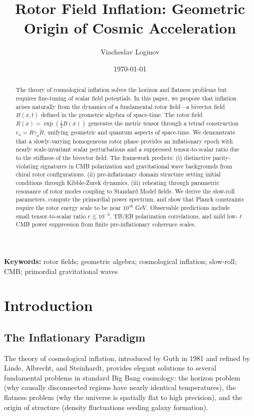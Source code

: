 \documentclass[11pt,a4paper]{article}
\title{Rotor Field Inflation: Geometric Origin of Cosmic Acceleration}
\author[1]{Viacheslav Loginov}
\affil[1]{Kyiv, Ukraine\\ \texttt{barthez.slavik@gmail.com}}
\date{\today} %
\numberwithin{equation}{section}
\theoremstyle{plain}
\theoremstyle{definition}
\theoremstyle{remark}
\newcommand{\keywords}{\textbf{Keywords:} rotor fields; geometric algebra; cosmological inflation; slow-roll; CMB; primordial gravitational waves}
\begin{document}
\maketitle

\begin{abstract}
The theory of cosmological inflation solves the horizon and flatness problems but requires fine-tuning of scalar field potentials. In this paper, we propose that inflation arises naturally from the dynamics of a fundamental rotor field---a bivector field $B(x,t)$ defined in the geometric algebra of space-time. The rotor field $R(x) = \exp(\frac{1}{2}B(x))$ generates the metric tensor through a tetrad construction $e_a = R\gamma_a\widetilde{R}$, unifying geometric and quantum aspects of space-time. We demonstrate that a slowly-varying homogeneous rotor phase provides an inflationary epoch with nearly scale-invariant scalar perturbations and a suppressed tensor-to-scalar ratio due to the stiffness of the bivector field. The framework predicts: (i) distinctive parity-violating signatures in CMB polarization and gravitational wave backgrounds from chiral rotor configurations, (ii) pre-inflationary domain structure setting initial conditions through Kibble-Zurek dynamics, (iii) reheating through parametric resonance of rotor modes coupling to Standard Model fields. We derive the slow-roll parameters, compute the primordial power spectrum, and show that Planck constraints require the rotor energy scale to be near $10^{16}$ GeV. Observable predictions include small tensor-to-scalar ratio $r \lesssim 10^{-3}$, TB/EB polarization correlations, and mild low-$\ell$ CMB power suppression from finite pre-inflationary coherence scales.
\end{abstract}

\keywords

\section{Introduction}
\label{sec:intro}

\subsection{The Inflationary Paradigm}

The theory of cosmological inflation, introduced by Guth in 1981 and refined by Linde, Albrecht, and Steinhardt, provides elegant solutions to several fundamental problems in standard Big Bang cosmology: the horizon problem (why causally disconnected regions have nearly identical temperatures), the flatness problem (why the universe is spatially flat to high precision), and the origin of structure (density fluctuations seeding galaxy formation).
\end{document}
